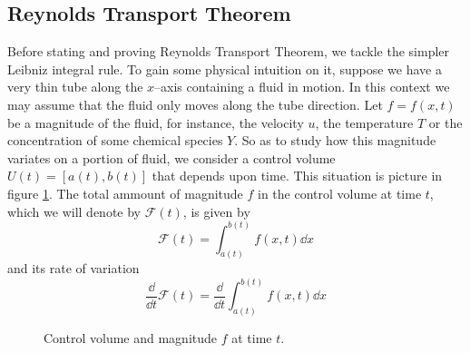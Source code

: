 
\subsection{Reynolds Transport Theorem}

Before stating and proving Reynolds Transport Theorem, we tackle the simpler
Leibniz integral rule. To gain some physical intuition on it, suppose we have a
very thin tube along the $x$--axis containing a fluid in motion. In this context
we may assume that the fluid only moves along the tube direction. Let $f =
f(x,t)$ be a magnitude of the fluid, for instance, the velocity $u$, the
temperature $T$ or the concentration of some chemical species $Y$. So as to
study how this magnitude variates on a portion of fluid, we consider a control
volume $U(t) = [a(t), b(t)]$ that depends upon time. This situation is picture
in figure \ref{fig:reynolds_transport_theorem_leibniz_rule}. The total ammount
of magnitude $f$ in the control volume at time $t$, which we will denote by
$\mathcal{F}(t)$, is given by
\begin{equation}
	\mathcal{F}(t) = \int_{a(t)}^{b(t)} f(x,t) \dd{x}
\end{equation}
and its rate of variation 
\begin{equation} \label{eq:reynolds_transport_theorem_motivation}
	\frac{\dd}{\dd{t}} \mathcal{F}(t) = 
	\frac{\dd}{\dd{t}} \int_{a(t)}^{b(t)} f(x,t) \dd{x}
\end{equation}

\begin{figure}[ht]
	\centering
	\caption{Control volume and magnitude $f$ at time $t$.}
	\label{fig:reynolds_transport_theorem_leibniz_rule}
\end{figure}

